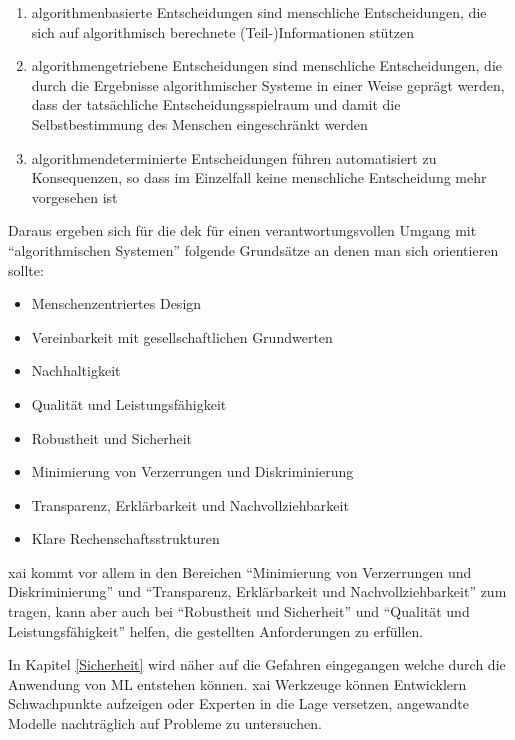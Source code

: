\documentclass[
  12pt, %
  a4paper, %
  oneside, %
  openany, 
  numbers=noenddot, %
  BCOR=5mm, %
  parskip=half*, %
  thesis, %
]{bfhbook}
\begin{document}
 \begin{enumerate}
   \item  algorithmenbasierte Entscheidungen sind menschliche Entscheidungen, die sich auf algorithmisch berechnete (Teil-)Informationen stützen
   \item algorithmengetriebene Entscheidungen sind menschliche Entscheidungen, die durch die Ergebnisse algorithmischer Systeme in einer Weise geprägt werden, dass der tatsächliche Entscheidungsspielraum und damit die Selbstbestimmung des Menschen eingeschränkt werden
   \item  algorithmendeterminierte Entscheidungen führen automatisiert zu Konsequenzen, so dass im Einzelfall keine menschliche Entscheidung mehr vorgesehen ist
\end{enumerate}

Daraus ergeben sich für die \acrlong{dek} für einen verantwortungsvollen Umgang mit ``algorithmischen Systemen'' folgende Grundsätze an denen man sich orientieren sollte:

\begin{itemize}
	\item Menschenzentriertes Design
	\item Vereinbarkeit mit gesellschaftlichen Grundwerten
	\item Nachhaltigkeit
	\item Qualität und Leistungsfähigkeit
	\item Robustheit und Sicherheit
	\item Minimierung von Verzerrungen und Diskriminierung
	\item Transparenz, Erklärbarkeit und Nachvollziehbarkeit
	\item Klare Rechenschaftsstrukturen
\end{itemize}

\acrlong{xai} kommt vor allem in den Bereichen ``Minimierung von Verzerrungen und Diskriminierung'' und ``Transparenz, Erklärbarkeit und Nachvollziehbarkeit'' zum tragen, kann aber auch bei ``Robustheit und Sicherheit'' und ``Qualität und Leistungsfähigkeit'' helfen, die gestellten Anforderungen zu erfüllen. 

In Kapitel \ref{Sicherheit} wird näher auf die Gefahren eingegangen welche durch die Anwendung von \Gls{ML} entstehen können. 
\Gls{xai} Werkzeuge können Entwicklern Schwachpunkte aufzeigen oder Experten in die Lage versetzen, angewandte Modelle nachträglich auf Probleme zu untersuchen.
\end{document}
